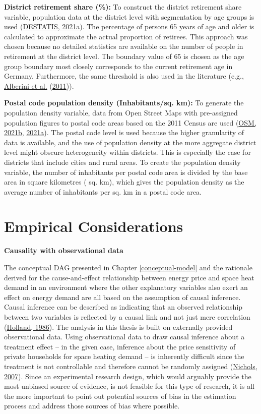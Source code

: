 \documentclass[12pt,twoside]{reedthesis}
\begin{document}
\textbf{District retirement share (\%):} To construct the district retirement share variable, population data at the district level with segmentation by age groups is used (\protect\hyperlink{ref-destatis21c}{DESTATIS, 2021a}). The percentage of persons 65 years of age and older is calculated to approximate the actual proportion of retirees. This approach was chosen because no detailed statistics are available on the number of people in retirement at the district level. The boundary value of 65 is chosen as the age group boundary most closely corresponds to the current retirement age in Germany. Furthermore, the same threshold is also used in the literature (e.g., \protect\hyperlink{ref-alberini_etal11}{Alberini et al.} (\protect\hyperlink{ref-alberini_etal11}{2011})).

\textbf{Postal code population density (Inhabitants/sq. km):} To generate the population density variable, data from Open Street Maps with pre-assigned population figures to postal code areas based on the 2011 Census are used (\protect\hyperlink{ref-osm21}{OSM, 2021b}, \protect\hyperlink{ref-osm21a}{2021a}). The postal code level is used because the higher granularity of data is available, and the use of population density at the more aggregate district level might obscure heterogeneity within districts. This is especially the case for districts that include cities and rural areas. To create the population density variable, the number of inhabitants per postal code area is divided by the base area in square kilometres ( sq. km), which gives the population density as the average number of inhabitants per sq. km in a postal code area.

\hypertarget{empirical-considerations}{%
\section{Empirical Considerations}\label{empirical-considerations}}

\textbf{Causality with observational data}

The conceptual DAG presented in Chapter \ref{conceptual-model} and the rationale derived for the cause-and-effect relationship between energy price and space heat demand in an environment where the other explanatory variables also exert an effect on energy demand are all based on the assumption of causal inference. Causal inference can be described as indicating that an observed relationship between two variables is reflected by a causal link and not just mere correlation (\protect\hyperlink{ref-holland86}{Holland, 1986}). The analysis in this thesis is built on externally provided observational data. Using observational data to draw causal inference about a treatment effect -- in the given case, inference about the price sensitivity of private households for space heating demand -- is inherently difficult since the treatment is not controllable and therefore cannot be randomly assigned (\protect\hyperlink{ref-nichols07}{Nichols, 2007}). Since an experimental research design, which would arguably provide the most unbiased source of evidence, is not feasible for this type of research, it is all the more important to point out potential sources of bias in the estimation process and address those sources of bias where possible.
\end{document}
